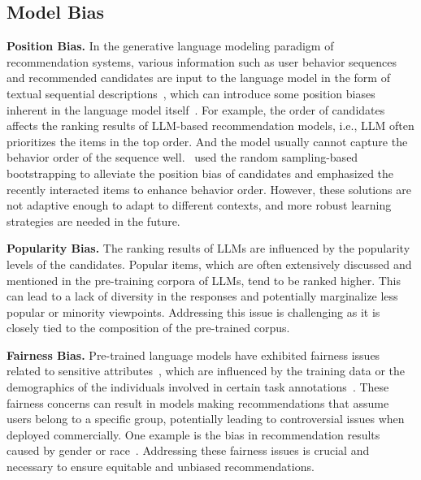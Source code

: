 \documentclass[sn-mathphys-num]{sn-jnl}%
\theoremstyle{thmstyleone}%
\theoremstyle{thmstyletwo}%
\theoremstyle{thmstylethree}%
\begin{document}
\subsection{Model Bias}
\noindent\textbf{Position Bias.} In the generative language modeling paradigm of recommendation systems, various information such as user behavior sequences and recommended candidates are input to the language model in the form of textual sequential descriptions~\cite{harte2023leveraging}, which can introduce some position biases inherent in the language model itself~\cite{lu2022fantastically}. For example, the order of candidates affects the ranking results of LLM-based recommendation models, i.e., LLM often prioritizes the items in the top order. And the model usually cannot capture the behavior order of the sequence well.~\cite{hou2022towards} used the random sampling-based bootstrapping to alleviate the position bias of candidates and emphasized the recently interacted items to enhance behavior order. However, these solutions are not adaptive enough to adapt to different contexts, and more robust learning strategies are needed in the future.

\noindent\textbf{Popularity Bias.} The ranking results of LLMs are influenced by the popularity levels of the candidates. Popular items, which are often extensively discussed and mentioned in the pre-training corpora of LLMs, tend to be ranked higher. This can lead to a lack of diversity in the responses and potentially marginalize less popular or minority viewpoints. Addressing this issue is challenging as it is closely tied to the composition of the pre-trained corpus.

\noindent\textbf{Fairness Bias.}
Pre-trained language models have exhibited fairness issues related to sensitive attributes~\cite{DBLP:journals/corr/abs-2305-07609,DBLP:journals/corr/abs-2403-05668}, which are influenced by the training data or the demographics of the individuals involved in certain task annotations~\cite{ferrara2023should}. These fairness concerns can result in models making recommendations that assume users belong to a specific group, potentially leading to controversial issues when deployed commercially. One example is the bias in recommendation results caused by gender or race~\cite{shen2023towards}. Addressing these fairness issues is crucial and necessary to ensure equitable and unbiased recommendations.
\end{document}
